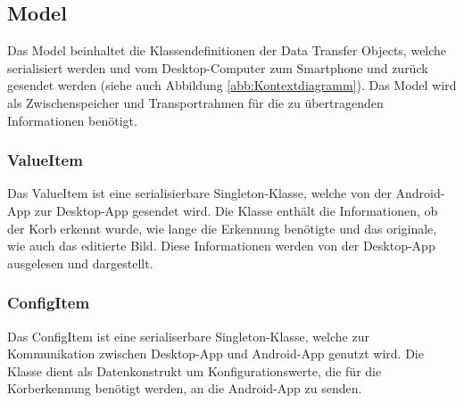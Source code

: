 \subsection{Model}
Das Model beinhaltet die Klassendefinitionen der Data Transfer Objects, welche serialisiert werden und vom Desktop-Computer zum Smartphone und 
zurück gesendet werden (siehe auch Abbildung \ref{abb:Kontextdiagramm}).
Das Model wird als Zwischenspeicher und Transportrahmen für die zu übertragenden Informationen benötigt.
\subsubsection{ValueItem}
Das ValueItem ist eine serialisierbare Singleton-Klasse, welche von der Android-App 
zur Desktop-App gesendet wird. Die Klasse enthält die Informationen, ob der Korb 
erkennt wurde, wie lange die Erkennung benötigte und das originale, wie auch das editierte Bild. 
Diese Informationen werden von der Desktop-App ausgelesen und dargestellt. 

\subsubsection{ConfigItem}
Das ConfigItem ist eine serialiserbare Singleton-Klasse, welche zur Kommunikation 
zwischen Desktop-App und Android-App genutzt wird. Die Klasse dient als Datenkonstrukt 
um Konfigurationswerte, die für die Korberkennung benötigt werden, an die Android-App zu senden.

            
            
